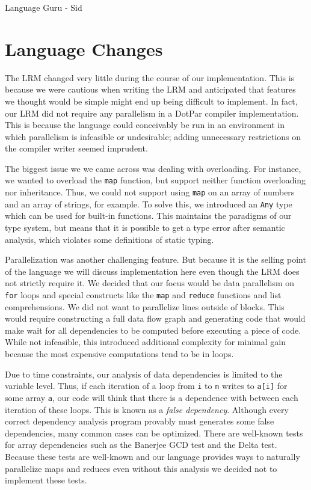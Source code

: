 Language Guru - Sid

\section{Language Changes}
The LRM changed very little during the course of our implementation. This is
because we were cautious when writing the LRM and anticipated that features we
thought would be simple might end up being difficult to implement. In fact, our
LRM did not require any parallelism in a DotPar compiler implementation. This is
because the language could conceivably be run in an environment in which
parallelism is infeasible or undesirable; adding unnecessary restrictions on the
compiler writer seemed imprudent.

The biggest issue we we came across was dealing with overloading. For instance,
we wanted to overload the \verb$map$ function, but support neither function
overloading nor inheritance. Thus, we could not support using \verb$map$ on an
array of numbers and an array of strings, for example. To solve this, we
introduced an \verb$Any$ type which can be used for built-in functions. This
maintains the paradigms of our type system, but means that it is possible to get
a type error after semantic analysis, which violates some definitions of static
typing.

Parallelization was another challenging feature. But because it is the selling
point of the language we will discuss implementation here even though the LRM
does not strictly require it. We decided that our focus would be data
parallelism on \verb$for$ loops and special constructs like the \verb$map$ and
\verb$reduce$ functions and list comprehensions. We did not want to parallelize
lines outside of blocks. This would require constructing a full data flow graph
and generating code that would make wait for all dependencies to be computed
before executing a piece of code. While not infeasible, this introduced
additional complexity for minimal gain because the most expensive computations
tend to be in loops.

Due to time constraints, our analysis of data dependencies is limited to the
variable level. Thus, if each iteration of a loop from \verb$i$ to \verb$n$
writes to \verb$a[i]$ for some array \verb$a$, our code will think that there is
a dependence with between each iteration of these loops. This is known as a
\emph{false dependency}. Although every correct dependency analysis program
provably must generates some false dependencies, many common cases can be
optimized. There are well-known tests for array dependencies such as the
Banerjee GCD test and the Delta test. Because these tests are well-known and our
language provides ways to naturally parallelize maps and reduces even without
this analysis we decided not to implement these tests.

